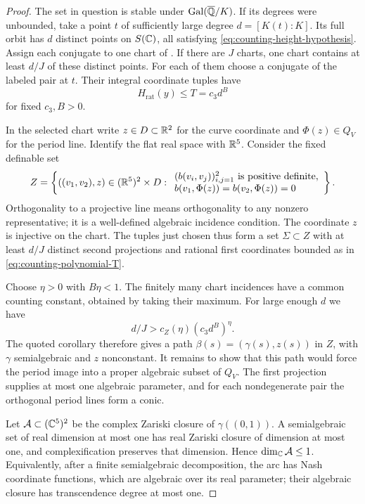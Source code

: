 \begin{proof}
The set in question is stable under $\operatorname{Gal}(\overline{\mathbb Q}/K)$.  If its degrees
were unbounded, take a point $t$ of sufficiently large degree
$d=[K(t):K]$.  Its full orbit has $d$ distinct points on $S(\mathbb C)$, all
satisfying \eqref{eq:counting-height-hypothesis}.  Assign each conjugate
to one chart of .  If there are $J$
charts, one chart contains at least $d/J$ of these distinct points.
For each of them choose a conjugate of the labeled pair at $t$.
Their integral coordinate tuples have
\begin{equation}\label{eq:counting-polynomial-T}
 H_{\mathrm{rat}}(y)\le T=c_3d^B
\end{equation}
for fixed $c_3,B>0$.

In the selected chart write $z\in D\subset\mathbb R^2$ for the curve
coordinate and $\Phi(z)\in Q_V$ for the period line.  Identify
the flat real space with $\mathbb R^5$.  Consider the fixed definable set
\begin{equation}\label{eq:counting-incidence}
 Z=\left\{((v_1,v_2),z)\in(\mathbb R^5)^2\times D:
 \begin{array}{l}
   (b(v_i,v_j))_{i,j=1}^2\text{ is positive definite},\\
   b(v_1,\Phi(z))=b(v_2,\Phi(z))=0
 \end{array}\right\}.
\end{equation}
Orthogonality to a projective line means orthogonality to any nonzero
representative; it is a well-defined algebraic incidence condition.
The coordinate $z$ is injective on the chart.  The tuples just chosen
thus form a set $\Sigma\subset Z$ with at least $d/J$ distinct second
projections and rational first coordinates bounded as in
\eqref{eq:counting-polynomial-T}.

Choose $\eta>0$ with $B\eta<1$.  The finitely many chart incidences
have a common counting constant, obtained by taking their maximum.
For large enough $d$ we have
\[
 d/J>c_Z(\eta)(c_3d^B)^\eta.
\]
The quoted corollary therefore gives a path
$\beta(s)=(\gamma(s),z(s))$ in $Z$, with $\gamma$ semialgebraic and
$z$ nonconstant.  It remains to show that this path would force the
period image into a proper algebraic subset of $Q_V$.  The first
projection supplies at most one algebraic parameter, and for each
nondegenerate pair the orthogonal period lines form a conic.

Let $\mathcal A\subset(\mathbb C^5)^2$ be the complex Zariski closure of
$\gamma((0,1))$.  A semialgebraic set of real dimension at most one
has real Zariski closure of dimension at most one, and complexification
preserves that dimension.  Hence
$\dim_{\mathbb C}\mathcal A\le1$.  Equivalently, after a finite
semialgebraic decomposition, the arc has Nash coordinate functions,
which are algebraic over its real parameter; their algebraic closure
has transcendence degree at most one.


\end{proof}
